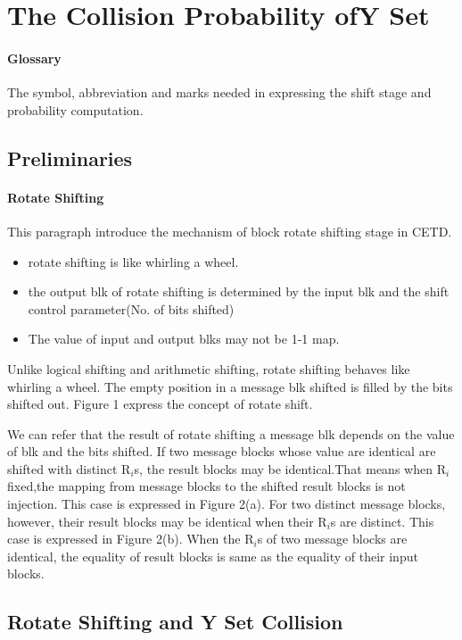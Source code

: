\documentclass{article}
\begin{document}
 

\section{The Collision Probability ofY Set} 
\paragraph{Glossary} The symbol, abbreviation and marks needed in
expressing the shift stage and probability computation.
\subsection{Preliminaries} 
\paragraph{Rotate Shifting} 
This paragraph introduce the mechanism of block rotate shifting stage in CETD.  
\begin{itemize} 
	\item rotate shifting is like whirling a wheel.  
	\item the output blk of rotate shifting is determined by the input blk and
the shift control parameter(No. of bits shifted) 
	\item The value of input and output blks may not be 1-1 map.
\end{itemize} 
Unlike logical shifting and arithmetic shifting, rotate shifting
behaves like whirling a wheel. The empty position in a message blk shifted is
filled by the bits shifted out. Figure 1 express the concept of rotate shift. 

We can refer that the result of rotate shifting a message blk depends on the
value of blk and the bits shifted.  If two message blocks whose value are
identical are shifted with distinct R$_i$s, the result blocks may be
identical.That means when R$_i$ fixed,the mapping from message blocks to the
shifted result blocks is not injection. This case is expressed in Figure 2(a).
For two distinct message blocks, however, their result blocks may be identical
when their R$_i$s are distinct. This case is expressed in Figure 2(b).  When
the R$_i$s of two message blocks are identical, the equality of result blocks
is same as the equality of their input blocks.

\subsection{Rotate Shifting and Y Set Collision} 
\end{document}
